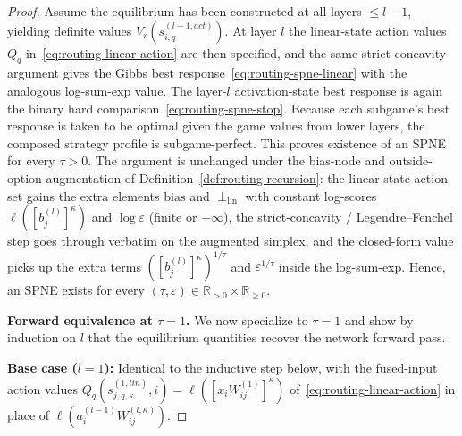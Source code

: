 \documentclass[twoside]{article}
\newcommand{\RR}{\mathbb{R}}
\newcommand{\1}{\mathbf{1}}
\begin{document}
\begin{proof}
Assume the equilibrium has been constructed at all layers $\le l-1$, yielding definite values
$V_r(s_{i,q}^{(l-1,act)})$. At layer $l$ the linear-state action values $Q_q$
in~\eqref{eq:routing-linear-action} are then specified, and the same strict-concavity argument
gives the Gibbs best response~\eqref{eq:routing-spne-linear} with the analogous log-sum-exp value.
The layer-$l$ activation-state best response is again the binary hard
comparison~\eqref{eq:routing-spne-stop}. Because each subgame's best response is taken to be
optimal given the game values from lower layers, the composed strategy profile is subgame-perfect.
This proves existence of an SPNE for every $\tau > 0$. The argument is unchanged under the
bias-node and outside-option augmentation of Definition~\ref{def:routing-recursion}: the
linear-state action set gains the extra elements $\mathrm{bias}$ and $\perp_{\mathrm{lin}}$ with
constant log-scores $\ell([b_j^{(l)}]^\kappa)$ and $\log \varepsilon$ (finite or $-\infty$), the
strict-concavity / Legendre--Fenchel step goes through verbatim on the augmented simplex, and the
closed-form value picks up the extra terms $([b_j^{(l)}]^\kappa)^{1/\tau}$ and
$\varepsilon^{1/\tau}$ inside the log-sum-exp. Hence, an SPNE exists for every $(\tau, \varepsilon)
    \in \RR_{>0} \times \RR_{\ge 0}$.

\textbf{Forward equivalence at $\tau = 1$.} We now specialize to $\tau = 1$ and show by induction
on $l$ that the equilibrium quantities recover the network forward pass.

\textbf{Base case ($l=1$):} Identical to the inductive step below, with the fused-input action
values $Q_q(s_{j,q,\kappa}^{(1, lin)}, i) = \ell([x_iW_{ij}^{(1)}]^\kappa)$
of~\eqref{eq:routing-linear-action} in place of $\ell(a_i^{(l-1)} W_{ij}^{(l,\kappa)})$.


\end{proof}
\end{document}
